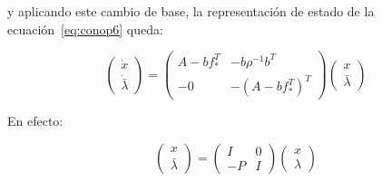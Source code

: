             y aplicando este cambio de base, la representación de estado de la ecuación~\ref{eq:conop6} queda:

            \begin{equation} \label{eq:conop10}
                \begin{pmatrix}
                    \dot{x} \\
                    \dot{\bar{\lambda}}
                \end{pmatrix} =
                \begin{pmatrix}
                    A - b f_*^T & -b \rho^{-1} b^T \\
                    -0 & - (A - b f_*^T)^T
                \end{pmatrix}
                \begin{pmatrix}
                    x \\
                    \bar{\lambda}
                \end{pmatrix}
            \end{equation}

            En efecto:

            \begin{equation*}
                \begin{pmatrix}
                    x \\
                    \bar{\lambda}
                \end{pmatrix} =
                \begin{pmatrix}
                    I & 0 \\
                    -P & I
                \end{pmatrix}
                \begin{pmatrix}
                    x \\
                    \lambda
                \end{pmatrix}
            \end{equation*}

